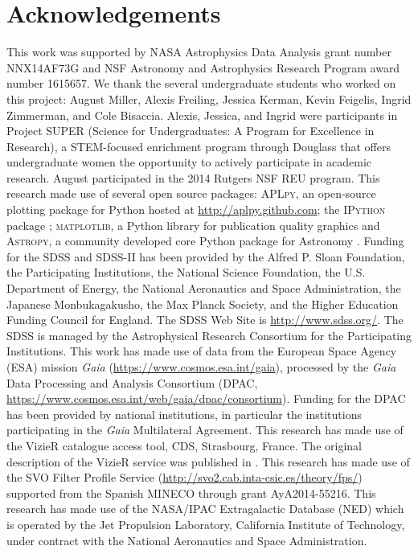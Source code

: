 \documentclass[apj, revtex4-1]{emulateapj}
\begin{document}
\section*{Acknowledgements}
This work was supported by NASA Astrophysics Data Analysis grant number NNX14AF73G and NSF Astronomy and Astrophysics Research Program award number 1615657. We thank the several undergraduate students who worked on this project: August Miller, Alexis Freiling, Jessica Kerman, Kevin Feigelis, Ingrid Zimmerman, and Cole Bisaccia. Alexis, Jessica, and Ingrid were participants in Project SUPER (Science for Undergraduates: A Program for Excellence in Research), a STEM-focused enrichment program through Douglass that offers undergraduate women the opportunity to actively participate in academic research. August participated in the 2014 Rutgers NSF REU program.
This research made use of several open source packages: \textsc{APLpy}, an open-source plotting package for Python hosted at \url{http://aplpy.github.com}; the \textsc{IPython} package \citep{Perez2007}; \textsc{matplotlib}, a Python library for publication quality graphics \citep{Hunter2007} and \textsc{Astropy}, a community developed core Python package for Astronomy \citep{TheAstropyCollaboration2013}.
Funding for the SDSS and SDSS-II has been provided by the Alfred P. Sloan Foundation, the Participating Institutions, the National Science Foundation, the U.S. Department of Energy, the National Aeronautics and Space Administration, the Japanese Monbukagakusho, the Max Planck Society, and the Higher Education Funding Council for England. The SDSS Web Site is \url{http://www.sdss.org/}. The SDSS is managed by the Astrophysical Research Consortium for the Participating Institutions.
This work has made use of data from the European Space Agency (ESA) mission \textit{Gaia} (\url{https://www.cosmos.esa.int/gaia}), processed by the \textit{Gaia} Data Processing and Analysis Consortium (DPAC, \url{https://www.cosmos.esa.int/web/gaia/dpac/consortium}). Funding for the DPAC has been provided by national institutions, in particular the institutions participating in the \textit{Gaia} Multilateral Agreement.
This research has made use of the VizieR catalogue access tool, CDS, Strasbourg, France. The original description of the VizieR service was published in \cite{Ochsenbein2000}.
This research has made use of the SVO Filter Profile Service (\url{http://svo2.cab.inta-csic.es/theory/fps/}) supported from the Spanish MINECO through grant AyA2014-55216.
This research has made use of the NASA/IPAC Extragalactic Database (NED) which is operated by the Jet Propulsion Laboratory, California Institute of Technology, under contract with the National Aeronautics and Space Administration.




\end{document}
